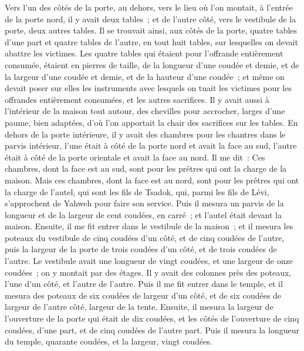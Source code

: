 \begin{multicols}{2}
Vers l'un des côtés de la porte, au dehors, vers le lieu où l'on montait, à l'entrée de la porte nord, il y avait deux tables~; et de l'autre côté, vers le vestibule de la porte, deux autres tables.
Il se trouvait ainsi, aux côtés de la porte, quatre tables d'une part et quatre tables de l'autre, en tout huit tables, sur lesquelles on devait abattre les victimes.
Les quatre tables qui étaient pour l'offrande entièrement consumée, étaient en pierres de taille, de la longueur d'une coudée et demie, et de la largeur d'une coudée et demie, et de la hauteur d'une coudée~; et même on devait poser sur elles les instruments avec lesquels on tuait les victimes pour les offrandes entièrement consumées, et les autres sacrifices.
Il y avait aussi à l'intérieur de la maison tout autour, des chevilles pour accrocher, larges d'une paume, bien adaptées, d'où l'on apportait la chair des sacrifices sur les tables.
En dehors de la porte intérieure, il y avait des chambres pour les chantres dans le parvis intérieur, l'une était à côté de la porte nord et avait la face au sud, l'autre était à côté de la porte orientale et avait la face au nord.
Il me dit~: Ces chambres, dont la face est au sud, sont pour les prêtres qui ont la charge de la maison.
Mais ces chambres, dont la face est au nord, sont pour les prêtres qui ont la charge de l'autel, qui sont les fils de Tsadok, qui, parmi les fils de Lévi, s'approchent de Yahweh pour faire son service.
Puis il mesura un parvis de la longueur et de la largeur de cent coudées, en carré~; et l'autel était devant la maison.
Ensuite, il me fit entrer dans le vestibule de la maison~; et il mesura les poteaux du vestibule de cinq coudées d'un côté, et de cinq coudées de l'autre, puis la largeur de la porte de trois coudées d'un côté, et de trois coudées de l'autre.
Le vestibule avait une longueur de vingt coudées, et une largeur de onze coudées~; on y montait par des étages. Il y avait des colonnes près des poteaux, l'une d'un côté, et l'autre de l'autre.
\VerseOne{}Puis il me fit entrer dans le temple, et il mesura des poteaux de six coudées de largeur d'un côté, et de six coudées de largeur de l'autre côté, largeur de la tente.
Ensuite, il mesura la largeur de l'ouverture de la porte qui était de dix coudées, et les côtés de l'ouverture de cinq coudées, d'une part, et de cinq coudées de l'autre part. Puis il mesura la longueur du temple, quarante coudées, et la largeur, vingt coudées.

\end{multicols}
